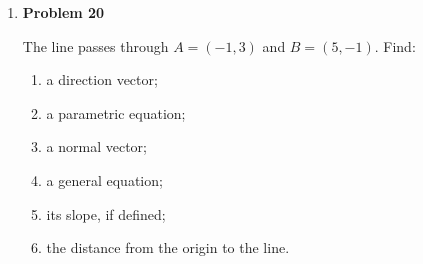 \begin{enumerate}
\item \textbf{Problem 20}\par
The line passes through \(A=(-1,3)\) and \(B=(5,-1)\). Find:
\begin{enumerate}
\item a direction vector;
\item a parametric equation;
\item a normal vector;
\item a general equation;
\item its slope, if defined;
\item the distance from the origin to the line.
\end{enumerate}
\end{enumerate}
